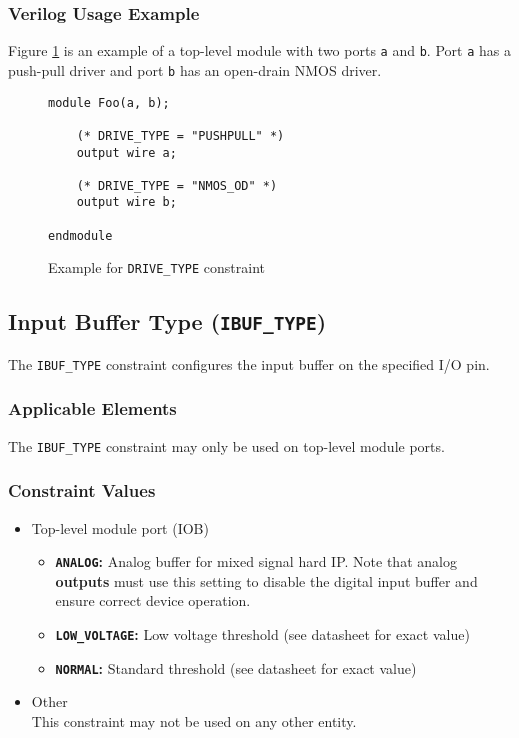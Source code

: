 \documentclass[11pt]{article}
\renewcommand\emph\textbf
\newcommand{\tokenstyle}[1]{\texttt{#1}}
\newcommand{\wirestyle}[1]{\texttt{#1}}
\newcommand{\valuestyle}[1]{\texttt{#1}}
\newcommand{\strvaluestyle}[1]{\valuestyle{\textquotedbl#1\textquotedbl}}
\newcommand{\strexamplestyle}[1]{\textbf{\strvaluestyle{#1}:}}
\newcommand{\whenstyle}[1]{{\fontseries{sb}\selectfont#1}}
\begin{document}
\subsubsection{Verilog Usage Example}

Figure \ref{constraint-drivetype} is an example of a top-level module with two ports \wirestyle{a} and \wirestyle{b}. Port \wirestyle{a} has a push-pull driver and port \wirestyle{b} has an open-drain NMOS driver.

\begin{figure}[h]
\begin{lstlisting}
module Foo(a, b);

	(* DRIVE_TYPE = "PUSHPULL" *)
	output wire a;

	(* DRIVE_TYPE = "NMOS_OD" *)
	output wire b;

endmodule
\end{lstlisting}
\caption{Example for \tokenstyle{DRIVE\_TYPE} constraint}
\label{constraint-drivetype}
\end{figure}


\pagebreak
\subsection{Input Buffer Type (\tokenstyle{IBUF\_TYPE})}

The \tokenstyle{IBUF\_TYPE} constraint configures the input buffer on the specified I/O pin.

\subsubsection{Applicable Elements}
The \tokenstyle{IBUF\_TYPE} constraint may only be used on top-level module ports.

\subsubsection{Constraint Values}
\begin{itemize}
\item \whenstyle{Top-level module port (IOB)}
	\begin{itemize}
		\item \strexamplestyle{ANALOG} Analog buffer for mixed signal hard IP. Note that analog \emph{outputs} must use this setting
		to disable the digital input buffer and ensure correct device operation.
		\item \strexamplestyle{LOW\_VOLTAGE} Low voltage threshold (see datasheet for exact value)
		\item \strexamplestyle{NORMAL} Standard threshold (see datasheet for exact value)
	\end{itemize}
\item \whenstyle{Other} \\
This constraint may not be used on any other entity.
\end{itemize}
\end{document}
